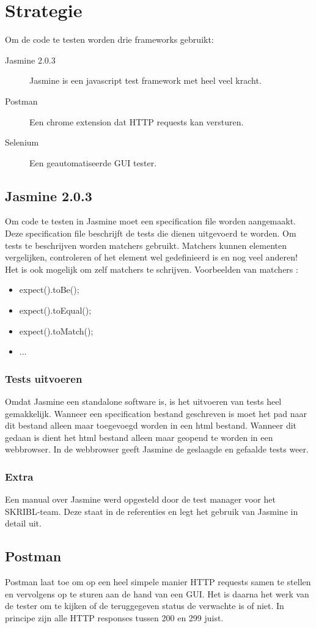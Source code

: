 \documentclass{article}
\begin{document}
\section{Strategie}
Om de code te testen worden drie frameworks gebruikt: 
\begin{description}
  \item[Jasmine 2.0.3] Jasmine is een javascript test framework met heel veel kracht.
  \item[Postman] Een chrome extension dat HTTP requests kan versturen. 
  \item[Selenium] Een geautomatiseerde GUI tester.
\end{description}
\subsection{Jasmine 2.0.3}
Om code te testen in Jasmine moet een specification file worden aangemaakt. Deze specification file beschrijft de tests die dienen uitgevoerd te worden. 
\newline
Om tests te beschrijven worden matchers gebruikt. Matchers kunnen elementen vergelijken, controleren of het element wel gedefinieerd is en nog veel anderen! Het is ook mogelijk om zelf matchers te schrijven.
Voorbeelden van matchers :
\begin{itemize}
  \item expect().toBe();
  \item expect().toEqual();
  \item expect().toMatch();
  \item ...
\end{itemize}
%
\subsubsection{Tests uitvoeren}
Omdat Jasmine een standalone software is, is het uitvoeren van tests heel gemakkelijk. Wanneer een specification bestand geschreven is moet het pad naar dit bestand alleen maar toegevoegd worden in een html bestand. Wanneer dit gedaan is dient het html bestand alleen maar geopend te worden in een webbrowser. In de webbrowser geeft Jasmine de geslaagde en gefaalde tests weer.
%
\subsubsection{Extra}
Een manual over Jasmine werd opgesteld door de test manager voor het SKRIBL-team. Deze staat in de referenties en legt het gebruik van Jasmine in detail uit.
%
\subsection{Postman}
Postman laat toe om op een heel simpele manier HTTP requests samen te stellen en vervolgens op te sturen aan de hand van een GUI. Het is daarna het werk van de tester om te kijken of de teruggegeven status de verwachte is of niet. In principe zijn alle HTTP responses tussen 200 en 299 juist.
%
\end{document}
